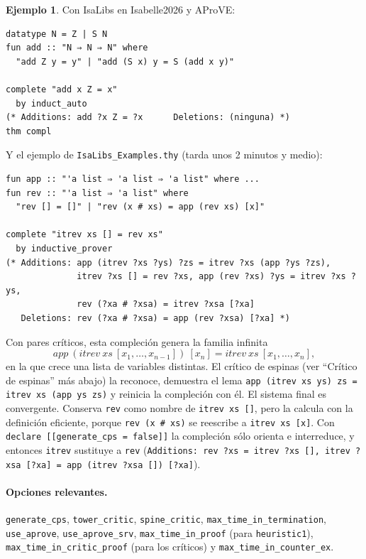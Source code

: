 \documentclass[11pt,a4paper]{article}
\newcommand{\isa}[1]{\texttt{#1}}
\theoremstyle{definition}
\newtheorem{ejemplo}[definicion]{Ejemplo}
\theoremstyle{remark}
\begin{document}
\begin{ejemplo}
Con IsaLibs en Isabelle2026 y AProVE:
\begin{lstlisting}
datatype N = Z | S N
fun add :: "N ⇒ N ⇒ N" where
  "add Z y = y" | "add (S x) y = S (add x y)"

complete "add x Z = x"
  by induct_auto
(* Additions: add ?x Z = ?x      Deletions: (ninguna) *)
thm compl
\end{lstlisting}
Y el ejemplo de \isa{IsaLibs\_Examples.thy} (tarda unos 2 minutos y medio):
\begin{lstlisting}
fun app :: "'a list ⇒ 'a list ⇒ 'a list" where ...
fun rev :: "'a list ⇒ 'a list" where
  "rev [] = []" | "rev (x # xs) = app (rev xs) [x]"

complete "itrev xs [] = rev xs"
  by inductive_prover
(* Additions: app (itrev ?xs ?ys) ?zs = itrev ?xs (app ?ys ?zs),
              itrev ?xs [] = rev ?xs, app (rev ?xs) ?ys = itrev ?xs ?ys,
              rev (?xa # ?xsa) = itrev ?xsa [?xa]
   Deletions: rev (?xa # ?xsa) = app (rev ?xsa) [?xa] *)
\end{lstlisting}
Con pares críticos, esta compleción genera la familia infinita
\[
  \mathit{app}\ (\mathit{itrev}\ \mathit{xs}\ [x_1,\ldots,x_{n-1}])\ [x_n] =
    \mathit{itrev}\ \mathit{xs}\ [x_1,\ldots,x_n],
\]
en la que crece una lista de variables distintas. El crítico de espinas (ver
``Crítico de espinas'' más abajo) la reconoce, demuestra el lema
\isa{app (itrev xs ys) zs = itrev xs (app ys zs)} y reinicia la compleción con él.
El sistema final es convergente. Conserva \isa{rev} como nombre de
\isa{itrev xs []}, pero la calcula con la definición eficiente, porque
\isa{rev (x \# xs)} se reescribe a \isa{itrev xs [x]}. Con
\isa{declare [[generate\_cps = false]]} la compleción sólo orienta e interreduce,
y entonces \isa{itrev} sustituye a \isa{rev} (\isa{Additions: rev ?xs = itrev ?xs [],
itrev ?xsa [?xa] = app (itrev ?xsa []) [?xa]}).
\end{ejemplo}

{\raggedright
\paragraph{Opciones relevantes.} \isa{generate\_cps}, \isa{tower\_critic},
\isa{spine\_critic},
\isa{max\_time\_in\_termination}, \isa{use\_aprove}, \isa{use\_aprove\_srv},
\isa{max\_time\_in\_proof} (para \isa{heuristic1}),
\isa{max\_time\_in\_critic\_proof} (para los críticos) y
\isa{max\_time\_in\_counter\_ex}.\par}
\end{document}

